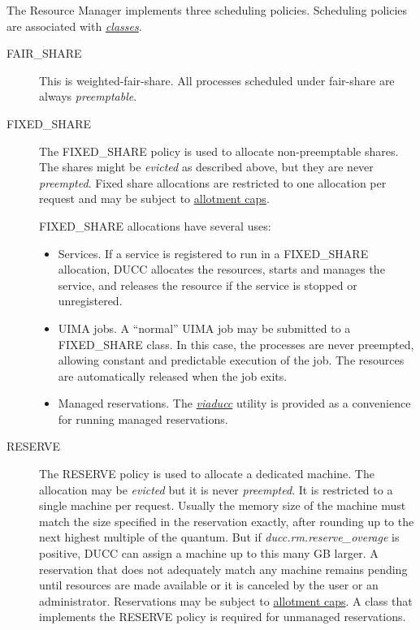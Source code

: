     The Resource Manager implements three scheduling policies. Scheduling policies are
    associated with \hyperref[sec:rm.job-classes]{\em classes}.
    \begin{description}
        \item[FAIR\_SHARE] This is weighted-fair-share.  All processes scheduled under
           fair-share are always {\em preemptable}.

        \item[FIXED\_SHARE] The FIXED\_SHARE policy is used to allocate non-preemptable
          shares.  The shares might be {\em evicted} as described above, but they are 
          never {\em preempted}.  Fixed share allocations are restricted to one
          allocation per request and may be subject to \hyperref[sec:rm.allotment]{allotment caps}.

          FIXED\_SHARE allocations have several uses:
          \begin{itemize}
            \item Services.  If a service is registered to run in a FIXED\_SHARE allocation,
              DUCC allocates the resources, starts and manages the service, and releases the
              resource if the service is stopped or unregistered.
            \item UIMA jobs.  A ``normal'' UIMA job may be submitted to a FIXED\_SHARE
              class.  In this case, the processes are never preempted, allowing constant and
              predictable execution of the job.  The resources are automatically released when
              the job exits.
            \item Managed reservations.  The \hyperref[sec:cli.viaducc]{\em viaducc} utility is provided 
              as a convenience for running managed reservations.
          \end{itemize}                    
          
        \item[RESERVE] The RESERVE policy is used to allocate a dedicated machine.
          The allocation may be {\em evicted} but it is never {\em preempted}. It is
          restricted to a single machine per request.  Usually the memory size
          of the machine must match the size specified in the reservation 
          exactly, after rounding up to the next highest multiple of the quantum.
          But if {\em ducc.rm.reserve\_overage} is positive, DUCC can assign a
          machine up to this many GB larger.
          A reservation that does not adequately match any
          machine remains pending until resources are made available or it is 
          canceled by the user or an administrator. Reservations may be
          subject to \hyperref[sec:rm.allotment]{allotment caps}.
          A class that implements the RESERVE policy is required for unmanaged reservations.

    \end{description}
    
